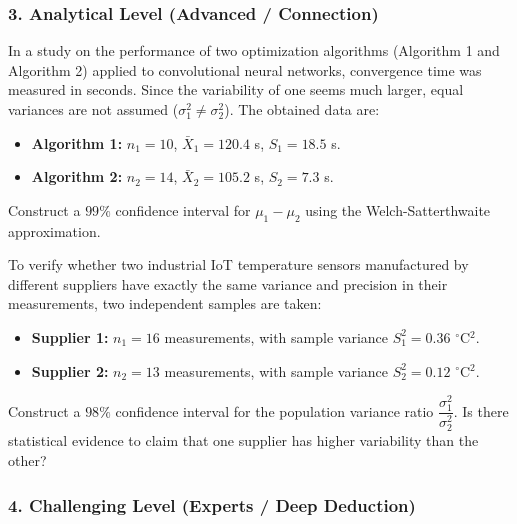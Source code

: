 \subsubsection*{3. Analytical Level (Advanced / Connection)}

\begin{problema}
	\label{prob:dif_medias_welch}
	In a study on the performance of two optimization algorithms (Algorithm 1 and Algorithm 2) applied to convolutional neural networks, convergence time was measured in seconds. Since the variability of one seems much larger, equal variances are not assumed ($\sigma_1^2 \neq \sigma_2^2$). The obtained data are:
	\begin{itemize}
		\item \textbf{Algorithm 1:} $n_1 = 10$, $\bar{X}_1 = 120.4$ s, $S_1 = 18.5$ s.
		\item \textbf{Algorithm 2:} $n_2 = 14$, $\bar{X}_2 = 105.2$ s, $S_2 = 7.3$ s.
	\end{itemize}
	Construct a $99\%$ confidence interval for $\mu_1 - \mu_2$ using the Welch-Satterthwaite approximation.
\end{problema}

\begin{problema}
	\label{prob:ic_razon_varianzas}
	To verify whether two industrial IoT temperature sensors manufactured by different suppliers have exactly the same variance and precision in their measurements, two independent samples are taken:
	\begin{itemize}
		\item \textbf{Supplier 1:} $n_1 = 16$ measurements, with sample variance $S_1^2 = 0.36$ $^\circ$C$^2$.
		\item \textbf{Supplier 2:} $n_2 = 13$ measurements, with sample variance $S_2^2 = 0.12$ $^\circ$C$^2$.
	\end{itemize}
	Construct a $98\%$ confidence interval for the population variance ratio $\dfrac{\sigma_1^2}{\sigma_2^2}$. Is there statistical evidence to claim that one supplier has higher variability than the other?
\end{problema}

\subsubsection*{4. Challenging Level (Experts / Deep Deduction)}

